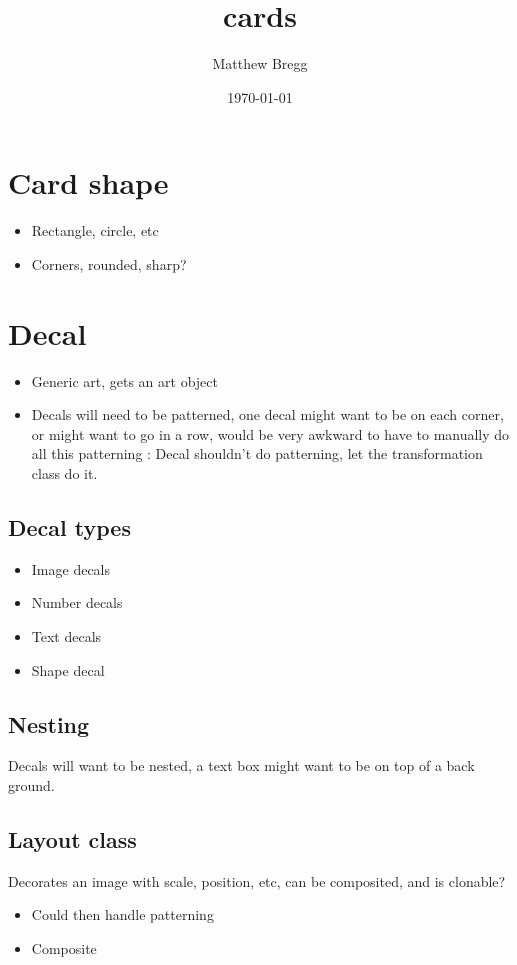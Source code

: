 \documentclass[11pt]{article}
\author{Matthew Bregg}
\date{\today}
\title{cards}
\begin{document}
\maketitle
\tableofcontents

\section{Card shape}
\label{sec-1}
\begin{itemize}
\item Rectangle, circle, etc
\item Corners, rounded, sharp?
\end{itemize}

\section{Decal}
\label{sec-2}

\begin{itemize}
\item Generic art, gets an art object
\item Decals will need to be patterned, one decal might want to be on each corner, or might want to go in a row, would be very awkward to have to manually do all this patterning : Decal shouldn't do patterning, let the transformation class do it.
\end{itemize}
\subsection{Decal types}
\label{sec-2-1}
\begin{itemize}
\item Image decals
\item Number decals
\item Text decals
\item Shape decal
\end{itemize}

\subsection{Nesting}
\label{sec-2-2}
Decals will want to be nested, a text box might want to be on top of a back ground.
\subsection{Layout class}
\label{sec-2-3}
Decorates an image with scale, position, etc, can be composited, and is clonable?
\begin{itemize}
\item Could then handle patterning
\item Composite
\end{itemize}
\end{document}
